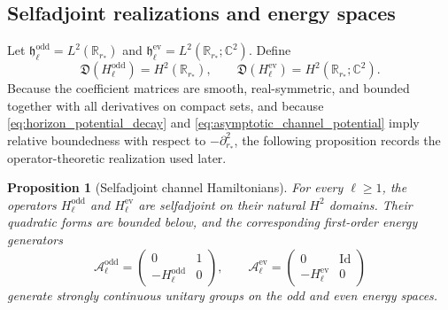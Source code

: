 \documentclass[12pt]{article}
\numberwithin{equation}{section}
\theoremstyle{plain}
\newtheorem{proposition}[theorem]{Proposition}
\theoremstyle{definition}
\theoremstyle{remark}
\newcommand{\R}{\mathbb R}
\newcommand{\C}{\mathbb C}
\newcommand{\cA}{\mathcal A}
\newcommand{\Id}{\mathrm{Id}}
\begin{document}
\subsection{Selfadjoint realizations and energy spaces}

Let $\mathfrak h_{\ell}^{\mathrm{odd}}=L^2(\R_{r_*})$ and $\mathfrak h_{\ell}^{\mathrm{ev}}=L^2(\R_{r_*};\C^2)$.  Define
\[
   \mathfrak D(H_{\ell}^{\mathrm{odd}})=H^2(\R_{r_*}),
   \qquad
   \mathfrak D(H_{\ell}^{\mathrm{ev}})=H^2(\R_{r_*};\C^2).
\]
Because the coefficient matrices are smooth, real-symmetric, and bounded together with all derivatives on compact sets, and because \eqref{eq:horizon_potential_decay} and \eqref{eq:asymptotic_channel_potential} imply relative boundedness with respect to $-\partial_{r_*}^2$, the following proposition records the operator-theoretic realization used later.

\begin{proposition}[Selfadjoint channel Hamiltonians]\label{prop:selfadjoint_channels}
For every $\ell\ge1$, the operators $H_{\ell}^{\mathrm{odd}}$ and $H_{\ell}^{\mathrm{ev}}$ are selfadjoint on their natural $H^2$ domains.  Their quadratic forms are bounded below, and the corresponding first-order energy generators
\[
   \cA_{\ell}^{\mathrm{odd}}=
   \begin{pmatrix}
      0&1\\
      -H_{\ell}^{\mathrm{odd}}&0
   \end{pmatrix},
   \qquad
   \cA_{\ell}^{\mathrm{ev}}=
   \begin{pmatrix}
      0&\Id\\
      -H_{\ell}^{\mathrm{ev}}&0
   \end{pmatrix}
\]
generate strongly continuous unitary groups on the odd and even energy spaces.
\end{proposition}
\end{document}
